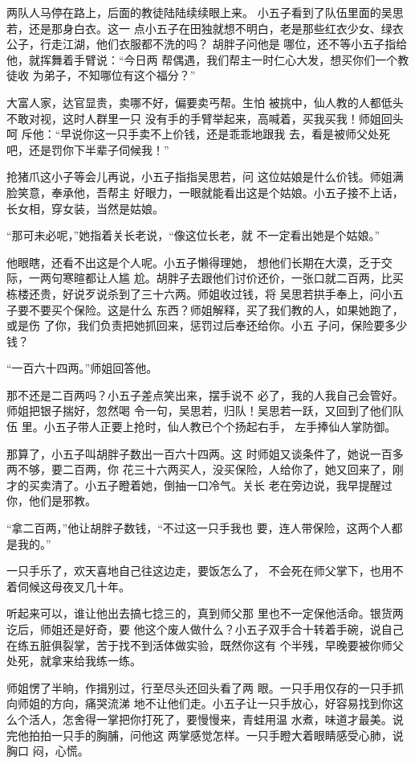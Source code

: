 两队人马停在路上，后面的教徒陆陆续续眼上来。
小五子看到了队伍里面的吴思若，还是那身白衣。这一
点小五子在田独就想不明白，老是那些红衣少女、绿衣
公子，行走江湖，他们衣服都不洗的吗？ 胡胖子问他是
哪位，还不等小五子指给他，就挥舞着手臂说：“今日两
帮偶遇，我们帮主一时仁心大发，想买你们一个教徒收
为弟子，不知哪位有这个福分？”

大富人家，达官显贵，卖哪不好，偏要卖丐帮。生怕
被挑中，仙人教的人都低头不敢对视，这时人群里一只
没有手的手臂举起来，高喊着，买我买我！师姐回头呵
斥他：“早说你这一只手卖不上价钱，还是乖乖地跟我
去，看是被师父处死吧，还是罚你下半辈子伺候我！”

抢猪爪这小子等会儿再说，小五子指指吴思若，问
这位姑娘是什么价钱。师姐满脸笑意，奉承他，吾帮主
好眼力，一眼就能看出这是个姑娘。小五子接不上话，
长女相，穿女装，当然是姑娘。

“那可未必呢，”她指着关长老说，“像这位长老，就
不一定看出她是个姑娘。”

他眼瞎，还看不出这是个人呢。小五子懒得理她，
想他们长期在大漠，乏于交际，一两句寒暄都让人尴
尬。胡胖子去跟他们讨价还价，一张口就二百两，比买
栋楼还贵，好说歹说杀到了三十六两。师姐收过钱，将
吴思若拱手奉上，问小五子要不要买个保险。这是什么
东西？师姐解释，买了我们教的人，如果她跑了，或是伤
了你，我们负责把她抓回来，惩罚过后奉还给你。小五
子问，保险要多少钱？

“一百六十四两。”师姐回答他。

那不还是二百两吗？小五子差点笑出来，摆手说不
必了，我的人我自己会管好。师姐把银子揣好，忽然喝
令一句，吴思若，归队！吴思若一跃，又回到了他们队伍
里。小五子带人正要上抢时，仙人教已个个扬起右手，
左手捧仙人掌防御。

那算了，小五子叫胡胖子数出一百六十四两。这
时师姐又谈条件了，她说一百多两不够，要二百两，你
花三十六两买人，没买保险，人给你了，她又回来了，刚
才的买卖清了。小五子瞪着她，倒抽一口冷气。关长
老在旁边说，我早提醒过你，他们是邪教。

“拿二百两，”他让胡胖子数钱，“不过这一只手我也
要，连人带保险，这两个人都是我的。”

一只手乐了，欢天喜地自己往这边走，要饭怎么了，
不会死在师父掌下，也用不着伺候这母夜叉几十年。

听起来可以，谁让他出去搞七捻三的，真到师父那
里也不一定保他活命。银货两讫后，师姐还是好奇，要
他这个废人做什么？小五子双手合十转着手碗，说自己
在练五脏俱裂掌，苦于找不到活体做实验，既然你这有
个半残，早晚要被你师父处死，就拿来给我练一练。

师姐愣了半晌，作揖别过，行至尽头还回头看了两
眼。一只手用仅存的一只手抓向师姐的方向，痛哭流涕
地不让他们走。小五子让一只手放心，好容易找到你这
么个活人，怎舍得一掌把你打死了，要慢慢来，青蛙用温
水煮，味道才最美。说完他拍拍一只手的胸脯，问他这
两掌感觉怎样。一只手瞪大着眼睛感受心肺，说胸口
闷，心慌。

